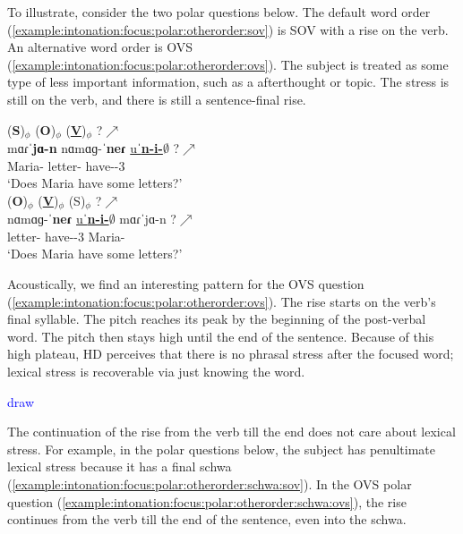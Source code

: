 To illustrate, consider the two polar questions below. The default word order (\ref{example:intonation:focus:polar:otherorder:sov}) is SOV with a rise on the verb. An alternative word order is OVS (\ref{example:intonation:focus:polar:otherorder:ovs}). The subject is treated as some type of less important information, such as a afterthought or topic. The stress is still on the verb, and there is still a sentence-final rise. 


\begin{exe}
	\ex \begin{xlist}
		\ex \glll (\textbf{S})$_\phi$ (\textbf{O})$_\phi$ (\textbf{\underline{V}})$_\phi$ ?$\nearrow$ \\
		mɑɾˈ\textbf{jɑ-n} nɑmɑɡ-ˈ\textbf{neɾ} \underline{uˈ\textbf{n-i-$\emptyset$}} ?$\nearrow$ \\
		Maria-{} letter-{\pl} have-{\thgloss}-3{\sg} \\
		\trans `Does Maria have some letters?' 
		\label{example:intonation:focus:polar:otherorder:sov}
		\\ 
		\ex \glll (\textbf{O})$_\phi$ (\textbf{\underline{V}})$_\phi$  ({S})$_\phi$ ?$\nearrow$ \\
		nɑmɑɡ-ˈ\textbf{neɾ} \underline{uˈ\textbf{n-i-$\emptyset$}} mɑɾˈ{jɑ-n}  ?$\nearrow$ \\
		letter-{\pl} have-{\thgloss}-3{\sg} Maria-{}  \\
		\trans `Does Maria have some letters?' 
		\label{example:intonation:focus:polar:otherorder:ovs}
		\\ 
		
	\end{xlist}
\end{exe}

Acoustically, we find an interesting pattern for the OVS question (\ref{example:intonation:focus:polar:otherorder:ovs}). The rise starts on the verb's final syllable. The pitch reaches its peak by the beginning of the post-verbal word. The pitch then stays high until the end of the sentence. Because of this high plateau, HD perceives that there is no phrasal stress  after the focused word; lexical stress is recoverable via just knowing the word. 

\textcolor{blue}{draw}

The continuation of the rise from the verb till the end does not care about lexical stress. For example, in the polar questions below, the subject has penultimate lexical stress because it has a final schwa (\ref{example:intonation:focus:polar:otherorder:schwa:sov}). In the OVS polar question (\ref{example:intonation:focus:polar:otherorder:schwa:ovs}), the rise continues from the verb till the end of the sentence, even into the schwa. 


